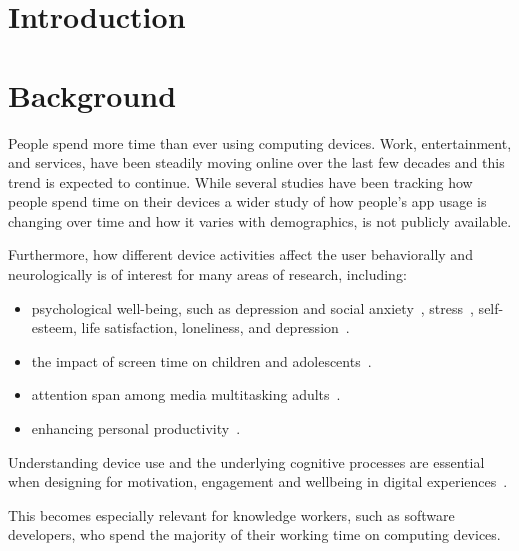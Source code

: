 \documentclass[a4paper]{article}
\begin{document}
\begin{refsection}

\section{Introduction}


\section{Background}

    People spend more time than ever using computing devices. Work, entertainment, and services, have been steadily moving online over the last few decades and this trend is expected to continue.
    While several studies have been tracking how people spend time on their devices a wider study of how people's app usage is changing over time and how it varies with demographics, is not publicly available.

    Furthermore, how different device activities affect the user behaviorally and neurologically is of interest for many areas of research, including:

    \begin{itemize}
        \item psychological well-being, such as depression and social anxiety~\cite{selfhout_different_2009}\cite{shah_nonrecursive_2002}, stress~\cite{mark_stress_2014}, self-esteem, life satisfaction, loneliness, and depression~\cite{huang_time_2017}.
        \item the impact of screen time on children and adolescents~\cite{subrahmanyam_impact_2001}.
        \item attention span among media multitasking adults~\cite{mark_stress_2014}.
        \item enhancing personal productivity~\cite{kim_timeaware_2016}.
    \end{itemize}

    Understanding device use and the underlying cognitive processes are essential when designing for motivation, engagement and wellbeing in digital experiences~\cite{peters_designing_2018}.

    This becomes especially relevant for knowledge workers, such as software developers, who spend the majority of their working time on computing devices.



\end{refsection}
\end{document}
